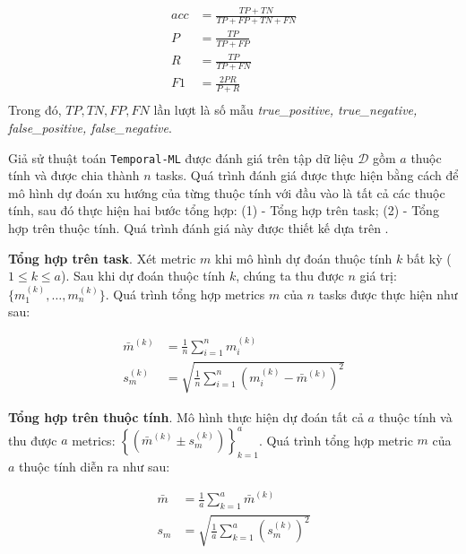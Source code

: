 \begin{align}
    acc &= \frac{TP+TN}{TP+FP+TN+FN}\label{eq:acc}\\
    P &= \frac{TP}{TP+FP}\label{eq:P}\\
    R &= \frac{TP}{TP+FN}\label{eq:R}\\
    F1 &= \frac{2PR}{P+R}\label{eq:F1}\\
\end{align}Trong đó, $TP, TN, FP, FN$ lần lượt là số mẫu \textit{true\_positive, true\_negative, false\_positive, false\_negative}.


Giả sử thuật toán \verb|Temporal-ML| được đánh giá trên tập dữ liệu $\mathcal{D}$ gồm $a$ thuộc tính và được chia thành $n$ tasks. Quá trình đánh giá được thực hiện bằng cách để mô hình dự đoán xu hướng của từng thuộc tính với đầu vào là tất cả các thuộc tính, sau đó thực hiện hai bước tổng hợp: (1) - Tổng hợp trên task; (2) - Tổng hợp trên thuộc tính. Quá trình đánh giá này được thiết kế dựa trên \cite{challu2023nhits}.

\textbf{Tổng hợp trên task}. Xét metric $m$ khi mô hình dự đoán thuộc tính $k$ bất kỳ ($1\leq k \leq a$). Sau khi dự đoán thuộc tính $k$, chúng ta thu được $n$ giá trị: $\{m^{(k)}_1,\dots,m^{(k)}_n\}$. Quá trình tổng hợp metrics $m$ của $n$ tasks được thực hiện như sau:

\begin{align}
    \bar{m}^{(k)} &= \frac{1}{n}\sum_{i=1}^n{m^{(k)}_i} \label{eq:mean_task}\\
    s^{(k)}_m &= \sqrt{\frac{1}{n} \sum_{i=1}^n{(m^{(k)}_i - \bar{m}^{(k)})^2}} \label{eq:std_task}
\end{align}

\textbf{Tổng hợp trên thuộc tính}. Mô hình thực hiện dự đoán tất cả $a$ thuộc tính và thu được $a$ metrics: $\left\{ \left( \bar{m}^{(k)}\pm s^{(k)}_m \right) \right\}_{k=1}^a$. Quá trình tổng hợp metric $m$ của $a$ thuộc tính diễn ra như sau:

\begin{align}
    \bar{m} &= \frac{1}{a}\sum_{k=1}^a{\bar{m}^{(k)}} \label{eq:mean_att}\\
    s_m &= \sqrt{\frac{1}{a} \sum_{k=1}^a{(s^{(k)}_m)^2}} \label{eq:std:att}
\end{align}


